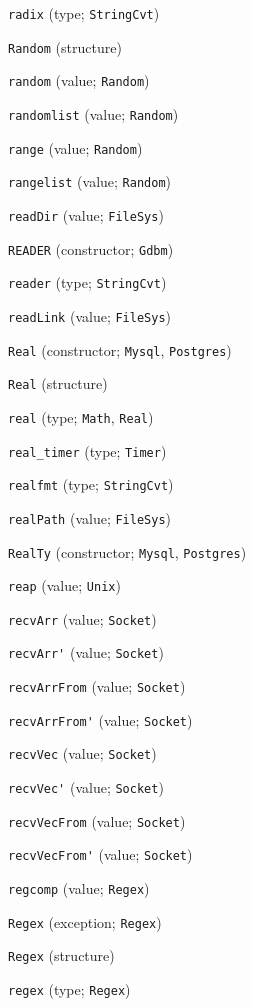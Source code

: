 \begin{description}
\item[] \verb"radix" (type; \verb"StringCvt")
\item[] \verb"Random" (structure)
\item[] \verb"random" (value; \verb"Random")
\item[] \verb"randomlist" (value; \verb"Random")
\item[] \verb"range" (value; \verb"Random")
\item[] \verb"rangelist" (value; \verb"Random")
\item[] \verb"readDir" (value; \verb"FileSys")
\item[] \verb"READER" (constructor; \verb"Gdbm")
\item[] \verb"reader" (type; \verb"StringCvt")
\item[] \verb"readLink" (value; \verb"FileSys")
\item[] \verb"Real" (constructor; \verb"Mysql", \verb"Postgres")
\item[] \verb"Real" (structure)
\item[] \verb"real" (type; \verb"Math", \verb"Real")
\item[] \verb"real_timer" (type; \verb"Timer")
\item[] \verb"realfmt" (type; \verb"StringCvt")
\item[] \verb"realPath" (value; \verb"FileSys")
\item[] \verb"RealTy" (constructor; \verb"Mysql", \verb"Postgres")
\item[] \verb"reap" (value; \verb"Unix")
\item[] \verb"recvArr" (value; \verb"Socket")
\item[] \verb"recvArr'" (value; \verb"Socket")
\item[] \verb"recvArrFrom" (value; \verb"Socket")
\item[] \verb"recvArrFrom'" (value; \verb"Socket")
\item[] \verb"recvVec" (value; \verb"Socket")
\item[] \verb"recvVec'" (value; \verb"Socket")
\item[] \verb"recvVecFrom" (value; \verb"Socket")
\item[] \verb"recvVecFrom'" (value; \verb"Socket")
\item[] \verb"regcomp" (value; \verb"Regex")
\item[] \verb"Regex" (exception; \verb"Regex")
\item[] \verb"Regex" (structure)
\item[] \verb"regex" (type; \verb"Regex")

\end{description}
